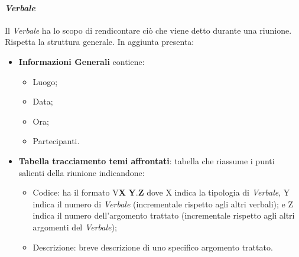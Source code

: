 \paragraph{\textit{Verbale}}
Il \textit{Verbale} ha lo scopo di rendicontare ciò che viene detto durante una riunione.
Rispetta la struttura generale.
In aggiunta presenta:
\begin{itemize} 
    \item \textbf{Informazioni Generali}
    contiene:
    \begin{itemize} 
        \item Luogo;
        \item Data;
        \item Ora;
        \item Partecipanti.
    \end{itemize}
\item \textbf{Tabella tracciamento temi affrontati}:
tabella che riassume i punti salienti della riunione indicandone:
    \begin{itemize} 
        \item Codice: ha il formato V\textbf{X} \textbf{Y}.\textbf{Z} dove X indica la tipologia di \textit{Verbale}, Y indica il numero di \textit{Verbale} (incrementale rispetto agli altri verbali);
        e Z indica il numero dell'argomento trattato (incrementale rispetto agli altri argomenti del \textit{Verbale});
        \item Descrizione: breve descrizione di uno specifico argomento trattato.
    \end{itemize}
\end{itemize}
